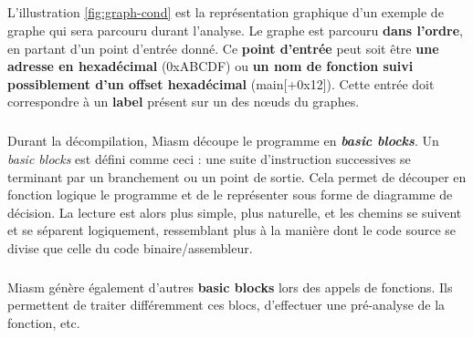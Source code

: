 \subparagraph{}
L'illustration \ref{fig:graph-cond} est la représentation graphique d'un exemple de graphe qui sera parcouru durant l'analyse. Le graphe est parcouru \textbf{dans l'ordre},
en partant d'un point d'entrée donné. Ce \textbf{point d'entrée} peut soit être \textbf{une adresse en hexadécimal} (0xABCDF) ou \textbf{un nom de fonction
suivi possiblement d'un offset hexadécimal} (main[+0x12]). Cette entrée doit correspondre à un \textbf{label} présent sur un des nœuds du graphes.
\subparagraph{}
Durant la décompilation, Miasm découpe le programme en \textbf{\textit{basic blocks}}. Un \textit{basic blocks} est défini comme ceci :
une suite d'instruction successives se terminant par un branchement ou un point de sortie. Cela permet de découper en fonction logique
le programme et de le représenter sous forme de diagramme de décision. La lecture est alors plus simple, plus naturelle, et les chemins se suivent et se
séparent logiquement, ressemblant plus à la manière dont le code source se divise que celle du code binaire/assembleur.
\subparagraph{}
Miasm génère également d'autres \textbf{basic blocks} lors des appels de fonctions. Ils permettent de traiter différemment ces blocs, d'effectuer une pré-analyse
de la fonction, etc.

